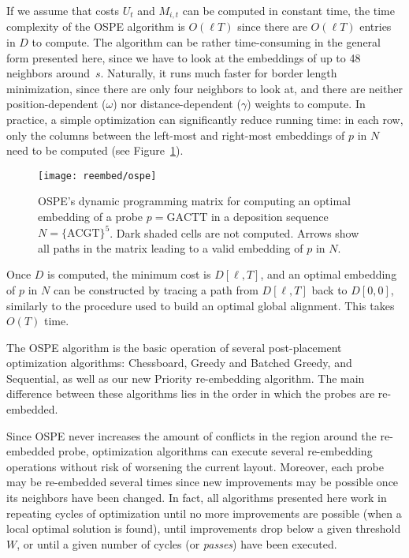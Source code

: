 If we assume that costs $U_t$ and $M_{i,t}$ can be computed in constant time,
the time complexity of the OSPE algorithm is $O(\ell T)$ since there are
$O(\ell T)$ entries in $D$ to compute. The algorithm can be rather
time-consuming in the general form presented here, since we have to look at the
embeddings of up to 48 neighbors around~$s$. Naturally, it runs much faster for
border length minimization, since there are only four neighbors to look at, and
there are neither position-dependent ($\omega$) nor distance-dependent
($\gamma$) weights to compute. In practice, a simple optimization can
significantly reduce running time: in each row, only the columns between the
left-most and right-most embeddings of $p$ in $N$ need to be computed (see
Figure~\ref{fig:ospe}).

\begin{figure}[t]\centering
\texttt{[image: reembed/ospe]}
\caption{\label{fig:ospe}%
  OSPE's dynamic programming matrix for computing an optimal embedding of a
  probe $p=\text{GACTT}$ in a deposition sequence $N=\text{\{ACGT\}}^5$. Dark
  shaded cells are not computed. Arrows show all paths in the matrix leading to
  a valid embedding of $p$ in $N$.}
\end{figure}

Once $D$ is computed, the minimum cost is $D[\ell,T]$, and an optimal embedding
of $p$ in $N$ can be constructed by tracing a path from $D[\ell,T]$ back to
$D[0,0]$, similarly to the procedure used to build an optimal global alignment.
This takes $O(T)$ time.

The OSPE algorithm is the basic operation of several post-placement optimization
algorithms: Chessboard, Greedy and Batched Greedy, and Sequential, as well as
our new Priority re-embedding algorithm. The main difference between these
algorithms lies in the order in which the probes are re-embedded.

Since OSPE never increases the amount of conflicts in the region around the
re-embedded probe, optimization algorithms can execute several re-embedding
operations without risk of worsening the current layout. Moreover, each probe
may be re-embedded several times since new improvements may be possible once its
neighbors have been changed. In fact, all algorithms presented here work in
repeating cycles of optimization until no more improvements are possible (when a
local optimal solution is found), until improvements drop below a given
threshold $W$, or until a given number of cycles (or \emph{passes}) have been
executed.

